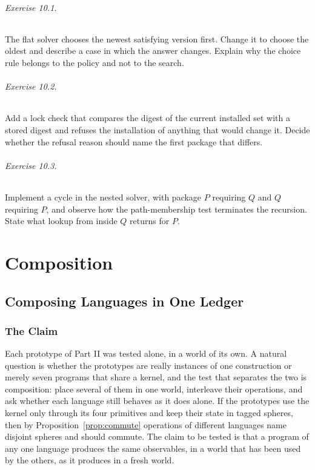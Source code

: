 \documentclass[11pt,oneside]{report}
\theoremstyle{plain}
\theoremstyle{definition}
\theoremstyle{remark}
\begin{document}
\paragraph{Exercise 10.1.} The flat solver chooses the newest satisfying version first. Change it to choose the oldest and describe a case in which the answer changes. Explain why the choice rule belongs to the policy and not to the search.

\paragraph{Exercise 10.2.} Add a lock check that compares the digest of the current installed set with a stored digest and refuses the installation of anything that would change it. Decide whether the refusal reason should name the first package that differs.

\paragraph{Exercise 10.3.} Implement a cycle in the nested solver, with package $P$ requiring $Q$ and $Q$ requiring $P$, and observe how the path-membership test terminates the recursion. State what lookup from inside $Q$ returns for $P$.
\part{Composition}

\chapter{Composing Languages in One Ledger}

\section{The Claim}

Each prototype of Part II was tested alone, in a world of its own. A natural question is whether the prototypes are really instances of one construction or merely seven programs that share a kernel, and the test that separates the two is composition: place several of them in one world, interleave their operations, and ask whether each language still behaves as it does alone. If the prototypes use the kernel only through its four primitives and keep their state in tagged spheres, then by Proposition~\ref{prop:commute} operations of different languages name disjoint spheres and should commute. The claim to be tested is that a program of any one language produces the same observables, in a world that has been used by the others, as it produces in a fresh world.
\end{document}
